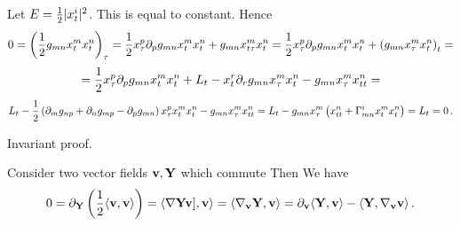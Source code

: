 Let $E={1\over 2}|x^i_t|^2$. This is equal to constant. Hence
                 $$
0=\left({1\over 2}g_{mn}x^m_t x^n_t\right)_\tau=
 {1\over 2}x^p_\tau \partial_p g_{mn}x^m_t x^n_t+g_{mn}x^m_{t\tau}x^n_t=
 {1\over 2}x^p_\tau \partial_p g_{mn}x^m_t x^n_t+
\left(g_{mn}x^m_{\tau}x^n_t\right)_t=
                            $$
                             $$
= {1\over 2}x^p_\tau \partial_p g_{mn}x^m_t x^n_t+
L_t-x^r_t\partial_r g_{mn}x^m_{\tau}x^n_t-g_{mn}x^m_{\tau}x^n_{tt}=
                          $$
                           $$
 L_t-{1\over 2}\left(\partial_mg_{np}+\partial_n g_{mp}-\partial_p g_{mn}\right)
          x^p_\tau x^m_t x^n_t-g_{mn}x^m_{\tau}x^n_{tt}=
L_t-g_{mn}x^m_{\tau}\left(x^n_{tt}+\Gamma^i_{mn}x^m_tx^n_t\right)=L_t=0\,.
                 $$

Invariant proof.

  Consider two vector fields ${\bf v},{\bf Y}$ which commute
     Then 
   We have
                 $$
0=\partial_{\bf Y}\left({1\over 2}\langle{\bf v},{\bf v}\rangle\right)=
  \langle\nabla{\bf Y}{\bf v}],{\bf v}\rangle=\langle\nabla_{\bf v}{\bf Y},{\bf v}\rangle=
\partial_{\bf v}\langle{\bf Y},{\bf v}\rangle-\langle{\bf Y},\nabla_{\bf v}{\bf v}\rangle\,.
                 $$



\bye
